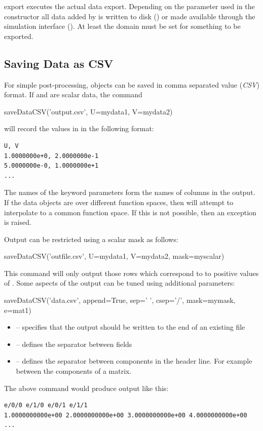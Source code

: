 \begin{methoddesc}[DataManager]{export}{}
    executes the actual data export. Depending on the  parameter
    used in the constructor all data added by  is written to
    disk () or made available through the \VisIt
    simulation interface ().
    At least the domain must be set for something to be exported.
\end{methoddesc}

\subsection{Saving Data as CSV}
\label{sec:savedatacsv}
For simple post-processing, \Data objects can be saved in comma separated
value (\emph{CSV}) format.
If  and  are scalar data, the command
\begin{python}
  saveDataCSV('output.csv', U=mydata1, V=mydata2)
\end{python}
will record the values in  in the following format:
\begin{verbatim}
U, V
1.0000000e+0, 2.0000000e-1
5.0000000e-0, 1.0000000e+1
...
\end{verbatim}

The names of the keyword parameters form the names of columns in the output.
If the data objects are over different function spaces, then 
will attempt to interpolate to a common function space.
If this is not possible, then an exception is raised.

Output can be restricted using a scalar mask as follows:
\begin{python}
  saveDataCSV('outfile.csv', U=mydata1, V=mydata2, mask=myscalar)
\end{python}
This command will only output those rows which correspond to to positive
values of .
Some aspects of the output can be tuned using additional parameters:
\begin{python}
  saveDataCSV('data.csv', append=True, sep=' ', csep='/', mask=mymask, e=mat1)
\end{python}

\begin{itemize}
 \item {} -- specifies that the output should be written to the end of an existing file
 \item {} -- defines the separator between fields
 \item {} -- defines the separator between components in the header
     line. For example between the components of a matrix.
\end{itemize}
%
The above command would produce output like this:
\begin{verbatim}
e/0/0 e/1/0 e/0/1 e/1/1
1.0000000000e+00 2.0000000000e+00 3.0000000000e+00 4.0000000000e+00
...
\end{verbatim}

